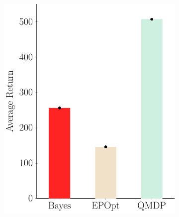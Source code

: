 \documentclass{article}
\begin{document}
\begin{figure}[t!]
\begin{centering}
\begin{subfigure}[b]{0.3\columnwidth}
\includegraphics[width=\linewidth]{figs/cheetah_env_comparison.pdf}
\end{subfigure}
~
\begin{subfigure}[b]{0.235\columnwidth}

\end{subfigure}
\end{centering}
\end{figure}
\end{document}
